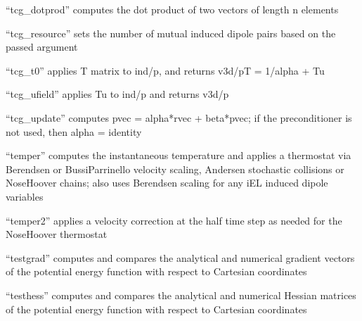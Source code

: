 \documentclass[letterpaper,11pt,english]{sphinxmanual}
\begin{document}
\sphinxAtStartPar
{}

\sphinxAtStartPar
“tcg\_dotprod” computes the dot product of two vectors of length n elements

\sphinxAtStartPar
{}

\sphinxAtStartPar
“tcg\_resource” sets the number of mutual induced dipole pairs based on the passed argument

\sphinxAtStartPar
{}

\sphinxAtStartPar
“tcg\_t0” applies T matrix to ind/p, and returns v3d/pT = 1/alpha + Tu

\sphinxAtStartPar
{}

\sphinxAtStartPar
“tcg\_ufield” applies \sphinxhyphen{}Tu to ind/p and returns v3d/p

\sphinxAtStartPar
{}

\sphinxAtStartPar
“tcg\_update” computes pvec = alpha*rvec + beta*pvec; if the preconditioner is not used, then alpha = identity

\sphinxAtStartPar
{}

\sphinxAtStartPar
“temper” computes the instantaneous temperature and applies a thermostat via Berendsen or Bussi\sphinxhyphen{}Parrinello velocity scaling, Andersen stochastic collisions or Nose\sphinxhyphen{}Hoover chains; also uses Berendsen scaling for any iEL induced dipole variables

\sphinxAtStartPar
{}

\sphinxAtStartPar
“temper2” applies a velocity correction at the half time step as needed for the Nose\sphinxhyphen{}Hoover thermostat

\sphinxAtStartPar
{}

\sphinxAtStartPar
“testgrad” computes and compares the analytical and numerical gradient vectors of the potential energy function with respect to Cartesian coordinates

\sphinxAtStartPar
{}

\sphinxAtStartPar
“testhess” computes and compares the analytical and numerical Hessian matrices of the potential energy function with respect to Cartesian coordinates

\sphinxAtStartPar
{}
\end{document}
